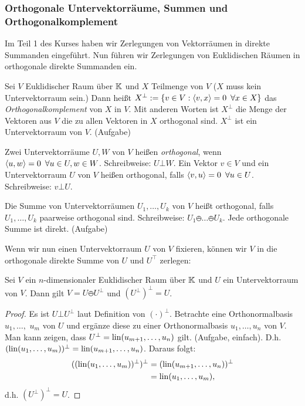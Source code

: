 \subsubsection{Orthogonale Untervektorräume, Summen und Orthogonalkomplement}

Im Teil 1 des Kurses haben wir Zerlegungen von Vektorräumen in direkte Summanden eingeführt. Nun führen wir Zerlegungen von Euklidischen Räumen in orthogonale direkte Summanden ein. 

Sei $ V $ Euklidischer Raum über $ \mathbb K $ und $ X$ Teilmenge von $V $ ($X$ muss kein Untervektorraum sein.) Dann heißt $ X^\bot := \{ v \in V : \left\langle v,x \right\rangle = 0 \enspace \forall x \in X \} $ das \emph{Orthogonalkomplement} von $ X $ in $ V $. Mit anderen Worten ist $X^\perp$ die Menge der Vektoren aus $V$ die zu allen Vektoren in $X$ orthogonal sind. $ X^\bot $ ist ein Untervektorraum von $ V $. (Aufgabe)

Zwei Untervektorräume $ U, W $ von $ V $ heißen \emph{orthogonal}, wenn $ \left\langle u,w \right\rangle = 0 \enspace \forall u \in U, w \in W $. Schreibweise: $ U \bot W $. Ein Vektor $ v \in V $ und ein Untervektorraum $ U $ von $ V $ heißen orthogonal, falls $ \left\langle v,u \right\rangle = 0 \enspace \forall u \in U $. Schreibweise: $ v \bot U $.

Die Summe von Untervektorräumen $ U_1, \ldots, U_k $ von $ V $ heißt orthogonal, falls $ U_1, \ldots, U_k $ paarweise orthogonal sind. Schreibweise: $ U_1 \obot \ldots \obot U_k $. Jede orthogonale Summe ist direkt. (Aufgabe)

Wenn wir nun einen Untervektorraum $U$ von $V$ fixieren, können wir $V$ in die orthogonale direkte Summe von $U$ und $U^\top$ zerlegen:  

\begin{thm}
	Sei $ V $ ein $ n $-dimensionaler Euklidischer Raum über $ \mathbb K $ und $ U $ ein Untervektorraum von $ V $. Dann gilt $ V = U \obot U^\bot $ und $ (U^\bot)^\bot = U $.
\end{thm}
\begin{proof}
	Es ist $ U \bot U^\bot $ laut Definition von $ (\cdot)^\bot $. Betrachte eine Orthonormalbasis $ u_1, \ldots, $ $ u_m $ von $ U $ und ergänze diese zu einer Orthonormalbasis $ u_1, \ldots, u_n $ von $ V $. Man kann zeigen, dass $ U^\bot = \operatorname{lin}(u_{m+1}, \ldots, u_n) $ gilt. (Aufgabe, einfach).
	D.h. $ (\operatorname{lin}(u_1, \ldots, u_m))^\bot = \operatorname{lin}(u_{m+1}, \ldots, u_n) $. Daraus folgt:
	\begin{align*}
		((\operatorname{lin}(u_1, \ldots, u_m))^\bot)^\bot &= (\operatorname{lin}(u_{m+1}, \ldots, u_n))^\bot \\
		&= \operatorname{lin}(u_1, \ldots, u_m),
	\end{align*}
	d.h. $ (U^\bot)^\bot = U $.
\end{proof}

